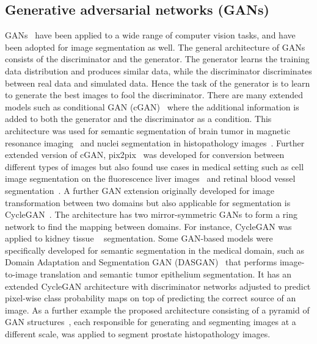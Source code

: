 \subsection{Generative adversarial networks (GANs)}
GANs~\cite{goodfellow2014generative} have been applied to a wide range of computer vision tasks, and have been adopted for image segmentation as well. The general architecture of GANs consists of the discriminator and the generator. The generator learns the training data distribution and produces similar data, while the discriminator discriminates between real data and simulated data. Hence the task of the generator is to learn to generate the best images to fool the discriminator. There are many extended models such as conditional GAN (cGAN)~\cite{mirza2014conditional} where the additional information is added to both the generator and the discriminator as a condition. This architecture was used for semantic segmentation of brain tumor in magnetic resonance imaging~\cite{rezaei2017conditional} and nuclei segmentation in histopathology images~\cite{mahmood2019deep}. Further extended version of cGAN, pix2pix~\cite{isola2017image} was developed for conversion between different types of images but also found use cases in medical setting such as cell image segmentation on the fluorescence liver images~\cite{Tsuda_2019_CVPR_Workshops} and retinal blood vessel segmentation~\cite{popescu2021retinal}. A further GAN extension originally developed for image transformation between two domains but also applicable for segmentation is CycleGAN~\cite{zhu2017unpaired}. The architecture has two mirror-symmetric GANs to form a ring network to find the mapping between domains. For instance, CycleGAN was applied to kidney tissue ~\cite{gadermayr2019generative} segmentation. Some GAN-based models were specifically developed for semantic segmentation in the medical domain, such as Domain Adaptation and Segmentation GAN (DASGAN)~\cite{kapil2019dasgan} that performs image-to-image translation and semantic tumor epithelium segmentation. It has an extended CycleGAN architecture with discriminator networks adjusted to predict pixel-wise class probability maps on top of predicting the correct source of an image. As a further example the proposed architecture consisting of a pyramid of GAN structures~\cite{li2022high}, each responsible for generating and segmenting images at a different scale, was applied to segment prostate histopathology images.

